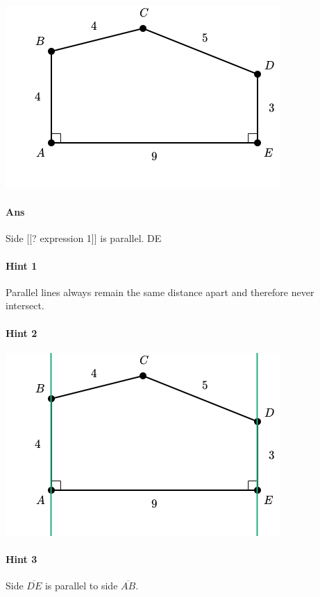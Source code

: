 \documentclass[twocolumn,10pt]{article}
\def\shrinkfactor{0.55}
\begin{document}
\includegraphics[scale=\shrinkfactor]{figures/8416b01e9ba095ab2d9c78d8fdec2e38ff55813b.png}

\paragraph{Ans} Side  [[? expression 1]] is parallel.
  DE

\paragraph{Hint 1}Parallel lines always remain the same distance apart and therefore never intersect. 

\paragraph{Hint 2}
\includegraphics[scale=\shrinkfactor]{figures/7fea3dbf376fe14f5825d4a39218b52942381530.png}

\paragraph{Hint 3}Side $\overline{DE}$ is parallel to side $\overline{AB}$.
\end{document}
